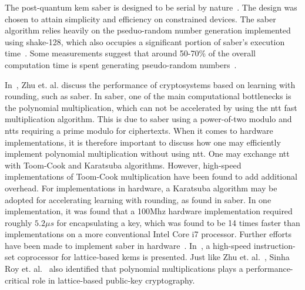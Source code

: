 The \gls{post-quantum} \gls{kem} \gls{saber} is designed to be serial by nature~\cite{sinha2019}. The design was chosen to attain simplicity and efficiency on constrained devices. The \gls{saber} algorithm relies heavily on the pseduo-random number generation implemented using \gls{shake}-128, which also occupies a significant portion of \gls{saber}'s execution time~\cite{sinha2019}. Some measurements suggest that around 50-70\% of the overall computation time is spent generating pseudo-random numbers~\cite{saber}.

In~\cite{zhu2021}, Zhu et. al. discuss the performance of cryptosystems based on learning with rounding, such as \gls{saber}. In \gls{saber}, one of the main computational bottlenecks is the polynomial multiplication, which can not be accelerated by using the \gls{ntt} fast multiplication algorithm. This is due to \gls{saber} using a power-of-two modulo and \glspl{ntt} requiring a prime modulo for ciphertexts. When it comes to hardware implementations, it is therefore important to discuss how one may efficiently implement polynomial multiplication without using \gls{ntt}. One may exchange \gls{ntt} with Toom-Cook and Karatsuba algorithms. However, high-speed implementations of Toom-Cook multiplication have been found to add additional overhead. For implementations in hardware, a Karatsuba algorithm may be adopted for accelerating learning with rounding, as found in \gls{saber}. In one implementation, it was found that a 100Mhz hardware implementation required roughly $5.2\mu s$ for encapsulating a key, which was found to be 14 times faster than implementations on a more conventional Intel Core i7 processor. Further efforts have been made to implement \gls{saber} in hardware~\cite{roy2020}. In~\cite{roy2020}, a high-speed instruction-set coprocessor for lattice-based \glspl{kem} is presented. Just like Zhu et. al.~\cite{zhu2021}, Sinha Roy et. al.~\cite{roy2020} also identified that polynomial multiplications plays a performance-critical role in lattice-based public-key cryptography.


